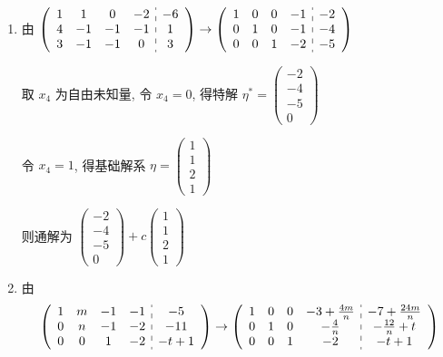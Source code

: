 	 \paragraph{} %
		 \begin{enumerate}
			 \item %
			       由 \( \left(\begin{array}{cccc:c}
					       1 & 1  & 0  & -2 & -6 \\
					       4 & -1 & -1 & -1 & 1  \\
					       3 & -1 & -1 & 0  & 3
				       \end{array} \right) \rightarrow
			       \left(\begin{array}{cccc:c}
					       1 & 0 & 0 & -1 & -2 \\
					       0 & 1 & 0 & -1 & -4 \\
					       0 & 0 & 1 & -2 & -5
				       \end{array}\right) \)

			       取 \( x_{4} \) 为自由未知量, 令 \( x_{4} = 0 \), 得特解 \( \eta^{*} = \begin{pmatrix}
				       -2 \\
				       -4 \\
				       -5 \\
				       0
			       \end{pmatrix} \)

			       令 \( x_{4} = 1 \), 得基础解系 \( \eta = \begin{pmatrix}
				       1 \\
				       1 \\
				       2 \\
				       1
			       \end{pmatrix} \)

			       则通解为 \( \begin{pmatrix}
				       -2 \\
				       -4 \\
				       -5 \\
				       0
			       \end{pmatrix} + c\begin{pmatrix}
				       1 \\
				       1 \\
				       2 \\
				       1
			       \end{pmatrix} \)
			 \item %
			       由 \[ \left(\begin{array}{cccc:c}
						       1 & m & -1 & -1 & -5   \\
						       0 & n & -1 & -2 & -11  \\
						       0 & 0 & 1  & -2 & -t+1
					       \end{array}\right)
				       \rightarrow
				       \left(\begin{array}{cccc:c}
						       1 & 0 & 0 & -3+\frac{4m}{n} & -7+\frac{24m}{n} \\
						       0 & 1 & 0 & -\frac{4}{n}    & -\frac{12}{n}+t  \\
						       0 & 0 & 1 & -2              & -t+1
					       \end{array}\right) \]


\end{enumerate}
